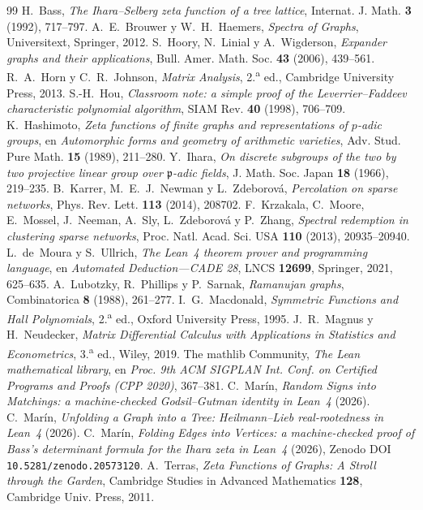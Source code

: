 \documentclass[11pt]{article}
\begin{document}
\begin{thebibliography}{99}
 H.~Bass, \emph{The Ihara--Selberg zeta function of a tree lattice}, Internat. J.
  Math. \textbf{3} (1992), 717--797.
 A.~E.~Brouwer y W.~H.~Haemers, \emph{Spectra of Graphs}, Universitext,
  Springer, 2012.
 S.~Hoory, N.~Linial y A.~Wigderson, \emph{Expander graphs and their applications},
  Bull. Amer. Math. Soc. \textbf{43} (2006), 439--561.
 R.~A.~Horn y C.~R.~Johnson, \emph{Matrix Analysis}, 2.\textsuperscript{a} ed.,
  Cambridge University Press, 2013.
 S.-H.~Hou, \emph{Classroom note: a simple proof of the Leverrier--Faddeev
  characteristic polynomial algorithm}, SIAM Rev. \textbf{40} (1998), 706--709.
 K.~Hashimoto, \emph{Zeta functions of finite graphs and representations of
  $p$-adic groups}, en \emph{Automorphic forms and geometry of arithmetic varieties}, Adv. Stud. Pure
  Math. \textbf{15} (1989), 211--280.
 Y.~Ihara, \emph{On discrete subgroups of the two by two projective linear group
  over $\mathfrak{p}$-adic fields}, J. Math. Soc. Japan \textbf{18} (1966), 219--235.
 B.~Karrer, M.~E.~J.~Newman y L.~Zdeborov\'a, \emph{Percolation on
  sparse networks}, Phys. Rev. Lett. \textbf{113} (2014), 208702.
 F.~Krzakala, C.~Moore, E.~Mossel, J.~Neeman, A.~Sly, L.~Zdeborov\'a y P.~Zhang,
  \emph{Spectral redemption in clustering sparse networks}, Proc. Natl. Acad. Sci. USA \textbf{110}
  (2013), 20935--20940.
 L.~de~Moura y S.~Ullrich, \emph{The Lean~4 theorem prover and programming
  language}, en \emph{Automated Deduction---CADE 28}, LNCS \textbf{12699}, Springer, 2021, 625--635.
 A.~Lubotzky, R.~Phillips y P.~Sarnak, \emph{Ramanujan graphs}, Combinatorica
  \textbf{8} (1988), 261--277.
 I.~G.~Macdonald, \emph{Symmetric Functions and Hall Polynomials},
  2.\textsuperscript{a} ed., Oxford University Press, 1995.
 J.~R.~Magnus y H.~Neudecker, \emph{Matrix Differential Calculus with
  Applications in Statistics and Econometrics}, 3.\textsuperscript{a} ed., Wiley, 2019.
 The mathlib Community, \emph{The Lean mathematical library}, en \emph{Proc. 9th
  ACM SIGPLAN Int. Conf. on Certified Programs and Proofs (CPP 2020)}, 367--381.
 C.~Mar\'in, \emph{Random Signs into Matchings: a machine-checked Godsil--Gutman
  identity in Lean~4} (2026).
 C.~Mar\'in, \emph{Unfolding a Graph into a Tree: Heilmann--Lieb real-rootedness in
  Lean~4} (2026).
 C.~Mar\'in, \emph{Folding Edges into Vertices: a machine-checked proof of Bass's
  determinant formula for the Ihara zeta in Lean~4} (2026), Zenodo DOI
  \texttt{10.5281/zenodo.20573120}.
 A.~Terras, \emph{Zeta Functions of Graphs: A Stroll through the Garden},
  Cambridge Studies in Advanced Mathematics \textbf{128}, Cambridge Univ. Press, 2011.
\end{thebibliography}
\end{document}

